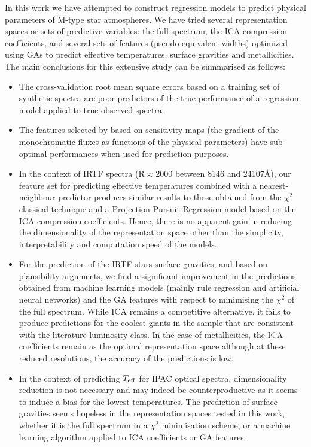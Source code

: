 

In this work we have attempted to construct regression models to
predict physical parameters of M-type star atmospheres. We have tried
several representation spaces or sets of predictive variables: the
full spectrum, the ICA compression coefficients, and several sets of
features (pseudo-equivalent widths) optimized using GAs to predict
effective temperatures, surface gravities and metallicities. The main
conclusions for this extensive study can be summarised as follows:
\begin{itemize}

\item The cross-validation root mean square errors based on a training set of synthetic spectra  are poor predictors of the true performance of a regression model applied to true observed spectra.

\item The features selected by \cite{cesetti} based on sensitivity maps (the gradient of the monochromatic fluxes as functions of the physical parameters) have sub-optimal performances when used for prediction purposes.

\item In the context of IRTF spectra (R$\approx$2000 between 8146 and 24107\AA), our feature set for predicting effective temperatures combined with a nearest-neighbour predictor produces similar results to those obtained from the $\chi^2$ classical technique and a Projection Pursuit Regression model based on the ICA compression coefficients. Hence, there is no apparent gain in reducing the dimensionality of the representation space other than the simplicity, interpretability and computation speed of the models.   

\item For the prediction of the IRTF stars surface gravities, and based on plausibility arguments, we find a significant improvement in the predictions obtained from machine learning models (mainly rule regression and artificial neural networks) and the GA features with respect to minimising the $\chi^2$ of the full spectrum. While ICA remains a competitive alternative, it fails to produce predictions for the coolest giants in the sample that are consistent with the literature luminosity class. In the case of metallicities, the ICA coefficients remain as the optimal representation space although at these reduced resolutions, the accuracy of the predictions is low. 

\item In the context of predicting $T_{\rm eff}$ for IPAC optical spectra, dimensionality reduction is not necessary and may indeed be counterproductive as it seems to induce a bias for the lowest temperatures. The prediction of surface gravities seems hopeless in the representation spaces tested in this work, whether it is the full spectrum in a $\chi^2$ minimisation scheme, or a machine learning algorithm applied to ICA coefficients or GA features.


\end{itemize}
